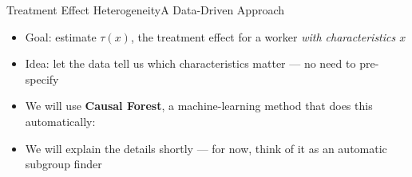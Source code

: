 \documentclass[hyperref={pdfpagelabels=false}]{beamer}
\begin{document}
\begin{frame}{Treatment Effect Heterogeneity}{A Data-Driven Approach}
\begin{itemize}
  \item Goal: estimate $\tau(x)$, the treatment effect for a worker \emph{with characteristics $x$}
  \vspace{0.25cm}
  \item Idea: let the data tell us which characteristics matter --- no need to pre-specify
  \vspace{0.25cm}
  \item We will use \textbf{Causal Forest}, a machine-learning method that does this automatically:
\end{itemize}
\vspace{0.2cm}
\begin{center}
\end{center}
\vspace{0.15cm}
\begin{itemize}
  \item We will explain the details shortly --- for now, think of it as an automatic subgroup finder
\end{itemize}
\end{frame}




\end{document}

